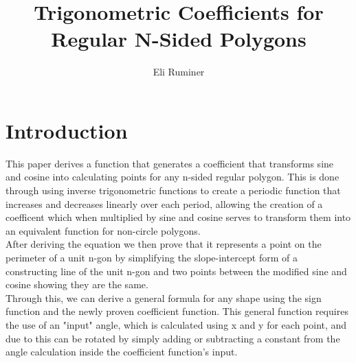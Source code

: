 \documentclass[11pt]{article}
\title{Trigonometric Coefficients for Regular N-Sided Polygons}
\author{Eli Ruminer}
\date{}
\begin{document}
\begin{titlepage}
\clearpage\maketitle
\thispagestyle{empty}
\end{titlepage}

\tableofcontents
\newpage

\section{Introduction}
This paper derives a function that generates a coefficient that transforms sine and cosine into calculating points for any n-sided regular polygon. This is done through using inverse trigonometric functions to create a periodic function that increases and decreases linearly over each period, allowing the creation of a coefficent which when multiplied by sine and cosine serves to transform them into an equivalent function for non-circle polygons.\\
 After deriving the equation we then prove that it represents a point on the perimeter of a unit n-gon by simplifying the slope-intercept form of a constructing line of the unit n-gon and two points between the modified sine and cosine showing they are the same. \\
Through this, we can derive a general formula for any shape using the sign function and the newly proven coefficient function. This general function requires the use of an "input" angle, which is calculated using x and y for each point, and due to this can be rotated by simply adding or subtracting a constant from the angle calculation inside the coefficient function's input.
\end{document}
